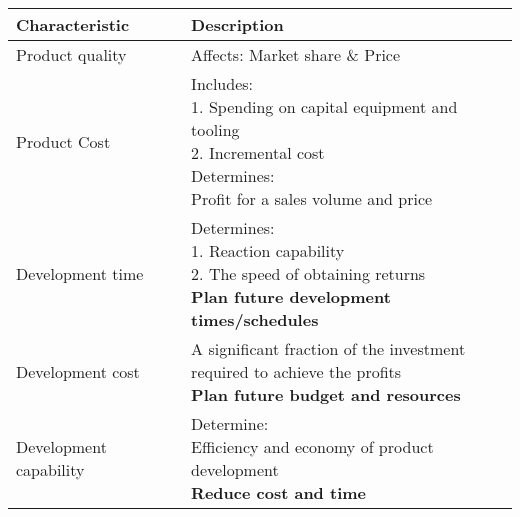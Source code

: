 \documentclass[openany,12pt,a4paper]{book}
\begin{document}
\begin{table}[H]
    \centering
    \begin{tabular}{l|l}
        \toprule
        \textbf{Characteristic} & \textbf{Description}\\
        \midrule
        Product quality & Affects: Market share \& Price\\\hline
        Product Cost & \makecell[l]{Includes:\\1. Spending on capital equipment and tooling\\2. Incremental cost\\Determines:\\Profit for a sales volume and price}\\\hline
        Development time &\makecell[l]{Determines:\\1. Reaction capability\\2. The speed of obtaining returns\\\textbf{Plan future development times/schedules}} \\\hline
        Development cost & \makecell[l]{A significant fraction of the investment \\required to achieve the profits\\\textbf{Plan future budget and resources}}\\\hline
        Development capability & \makecell[l]{Determine:\\Efficiency and economy of product development\\\textbf{Reduce cost and time}}\\
        \bottomrule
    \end{tabular}
\end{table}
\end{document}
